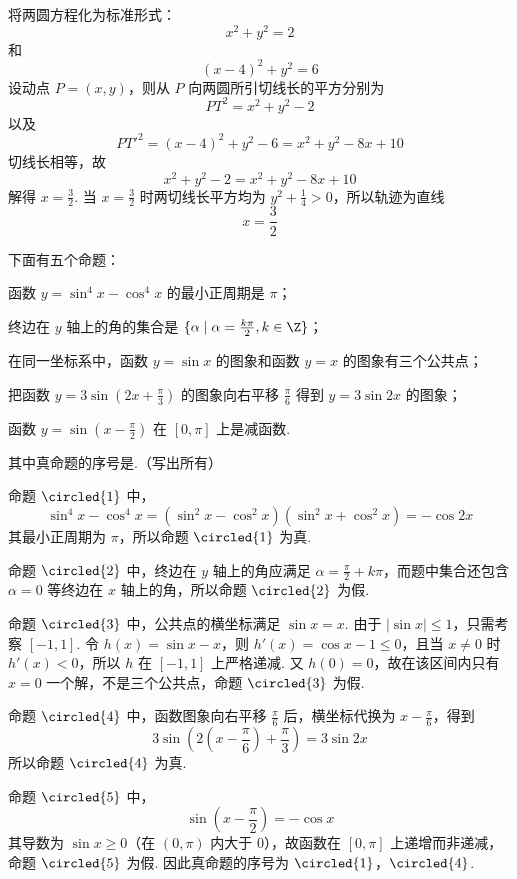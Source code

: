 \begin{solution}
将两圆方程化为标准形式：
\[
x^2+y^2=2
\]
和
\[
(x-4)^2+y^2=6
\]
设动点 \(P=(x,y)\)，则从 \(P\) 向两圆所引切线长的平方分别为
\[
PT^2=x^2+y^2-2
\]
以及
\[
PT'^2=(x-4)^2+y^2-6=x^2+y^2-8x+10
\]
切线长相等，故
\[
x^2+y^2-2=x^2+y^2-8x+10
\]
解得 \(x=\frac32\). 当 \(x=\frac32\) 时两切线长平方均为 \(y^2+\frac14>0\)，所以轨迹为直线
\[
x=\frac32
\]
\end{solution}

\begin{problem}
下面有五个命题：

\begin{circlelist}
\item 函数 \(y = \sin^{4}x - \cos^{4}x\) 的最小正周期是 \(\pi\)；
\item 终边在 \(y\) 轴上的角的集合是 \(\{\alpha \mid \alpha = \frac{k\pi}{2}, k\in\Z\}\)；
\item 在同一坐标系中，函数 \(y = \sin x\) 的图象和函数 \(y = x\) 的图象有三个公共点；
\item 把函数 \(y = 3\sin\!\left(2x + \frac{\pi}{3}\right)\) 的图象向右平移 \(\frac{\pi}{6}\) 得到 \(y = 3\sin 2x\) 的图象；
\item 函数 \(y = \sin\!\left(x - \frac{\pi}{2}\right)\) 在 \([0,\pi]\) 上是减函数.
\end{circlelist}

其中真命题的序号是\fillinblank{}.（写出所有）
\end{problem}


\begin{solution}
命题 \(\circled{1}\) 中，
\[
\sin^4x-\cos^4x=(\sin^2x-\cos^2x)(\sin^2x+\cos^2x)=-\cos2x
\]
其最小正周期为 \(\pi\)，所以命题 \(\circled{1}\) 为真.

命题 \(\circled{2}\) 中，终边在 \(y\) 轴上的角应满足 \(\alpha=\frac\pi2+k\pi\)，而题中集合还包含 \(\alpha=0\) 等终边在 \(x\) 轴上的角，所以命题 \(\circled{2}\) 为假.

命题 \(\circled{3}\) 中，公共点的横坐标满足 \(\sin x=x\). 由于 \(|\sin x|\leq1\)，只需考察 \([-1,1]\). 令 \(h(x)=\sin x-x\)，则 \(h'(x)=\cos x-1\leq0\)，且当 \(x\ne0\) 时 \(h'(x)<0\)，所以 \(h\) 在 \([-1,1]\) 上严格递减. 又 \(h(0)=0\)，故在该区间内只有 \(x=0\) 一个解，不是三个公共点，命题 \(\circled{3}\) 为假.

命题 \(\circled{4}\) 中，函数图象向右平移 \(\frac\pi6\) 后，横坐标代换为 \(x-\frac\pi6\)，得到
\[
3\sin\left(2\left(x-\frac\pi6\right)+\frac\pi3\right)=3\sin2x
\]
所以命题 \(\circled{4}\) 为真.

命题 \(\circled{5}\) 中，
\[
\sin\left(x-\frac\pi2\right)=-\cos x
\]
其导数为 \(\sin x\geq0\)（在 \((0,\pi)\) 内大于 \(0\)），故函数在 \([0,\pi]\) 上递增而非递减，命题 \(\circled{5}\) 为假. 因此真命题的序号为 \(\circled{1}\)，\(\circled{4}\).
\end{solution}

